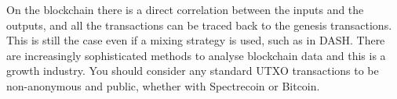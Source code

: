 On the blockchain there is a direct correlation between the inputs and the outputs, and all the transactions 
can be traced back to the genesis transactions. This is still the case even if a mixing strategy is used, such 
as in DASH. There are increasingly sophisticated methods to analyse blockchain data and this is a growth 
industry. You should consider any standard UTXO transactions to be non-anonymous and public, whether 
with Spectrecoin or Bitcoin.